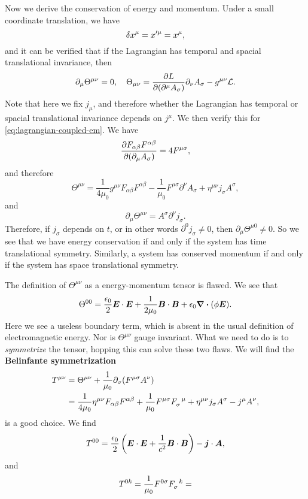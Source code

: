 \documentclass[hyperref, a4paper]{article}
\newcommand*{\concept}[1]{{\textbf{#1}}}
\begin{document}
Now we derive the conservation of energy and momentum. Under a small coordinate translation, we have 
\[
    \var{x^\mu} = x'^\mu = x^\mu,
\]
and it can be verified that if the Lagrangian has temporal and spacial translational invariance, then 
\begin{equation}
    \partial_\mu \Theta^{\mu \nu} = 0, \quad \Theta_{\mu \nu} = \pdv{L}{(\partial^\mu A_\sigma)} \partial_\nu A_{\sigma} - g^{\mu \nu} \mathcal{L}.
\end{equation}
Note that here we fix $j_\mu$, and therefore whether the Lagrangian has temporal or spacial translational 
invariance depends on $j^\mu$. We then verify this for \eqref{eq:lagrangian-coupled-em}. We have 
\[
    \pdv{F_{\alpha \beta} F^{\alpha \beta}}{(\partial_\mu A_\sigma)} = 4 F^{\mu \sigma},
\]
and therefore 
\begin{equation}
    \Theta^{\mu \nu} = \frac{1}{4 \mu_0} g^{\mu \nu} F_{\alpha \beta} F^{\alpha \beta} - \frac{1}{\mu_0} F^{\mu \sigma} \partial^\nu A_\sigma + \eta^{\mu \nu} j_\sigma A^\sigma,
\end{equation}
and 
\begin{equation}
    \partial_\mu \Theta^{\mu \nu} = A^\sigma \partial^\nu j_\sigma.
\end{equation}
Therefore, if $j_\sigma$ depends on $t$, or in other words $\partial^0 j_\sigma \neq 0$, then $\partial_\mu \Theta^{\mu 0} \neq 0$.
So we see that we have energy conservation if and only if the system has time translational symmetry.
Similarly, a system has conserved momentum if and only if the system has space translational symmetry.

The definition of $\Theta^{\mu \nu}$ as a energy-momentum tensor is flawed. We see that 
\begin{equation}
    \Theta^{00} = \frac{\epsilon_0}{2} \vb*{E} \cdot \vb*{E} + \frac{1}{2 \mu_0} \vb*{B} \cdot \vb*{B} + \epsilon_0 \div{(\phi \vb*{E})}.
\end{equation}
Here we see a useless boundary term, which is absent in the usual definition of electromagnetic energy.
Nor is $\Theta^{\mu \nu}$ gauge invariant. What we need to do is to \emph{symmetrize} the tensor, hopping
this can solve these two flaws. We will find the \concept{Belinfante symmetrization} 
\begin{equation}
    \begin{aligned}
        T^{\mu \nu} &= \Theta^{\mu \nu} + \frac{1}{\mu_0} \partial_\sigma (F^{\mu \sigma} A^\nu) \\
        &= \frac{1}{4 \mu_0} \eta^{\mu \nu} F_{\alpha \beta} F^{\alpha \beta} 
        + \frac{1}{\mu_0} F^{\mu \sigma} F\indices{_\sigma^\mu} + \eta^{\mu \nu} j_\sigma A^\sigma - j^\mu A^\nu,
    \end{aligned}
\end{equation} 
is a good choice. We find 
\begin{equation}
    T^{00} = \frac{\epsilon_0}{2} \left( \vb*{E} \cdot \vb*{E} + \frac{1}{c^2} \vb*{B} \cdot \vb*{B} \right) - \vb*{j} \cdot \vb*{A} ,
\end{equation}
and 
\begin{equation}
    T^{0 k} = \frac{1}{\mu_0} F^{0 \sigma} F\indices{_{\sigma}^k} = 
\end{equation}
\end{document}
